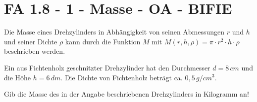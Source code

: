 \section{FA 1.8 - 1 - Masse - OA - BIFIE}

\begin{beispiel}[FA 1.8]{1} %
Die Masse eines Drehzylinders in Abhängigkeit von seinen Abmessungen $r$ und $h$ und seiner Dichte $\rho$ kann durch die Funktion $M$ mit $M(r,h,\rho)=\pi \cdot r^2\cdot h\cdot \rho$ beschrieben werden.

Ein aus Fichtenholz geschnitzter Drehzylinder hat den Durchmesser $d=8\,cm$ und die Höhe $h=6\,dm$. Die Dichte von Fichtenholz beträgt ca. $0,5\,g/cm^3$.

Gib die Masse des in der Angabe beschriebenen Drehzylinders in Kilogramm an!
\leer

\end{beispiel}
